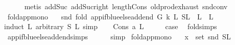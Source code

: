 \begin{isabellebody}
\ \ \ \ \isamarkupfalse%
\ {\isacharparenleft}{\kern0pt}metis\ add{\isacharunderscore}{\kern0pt}Suc\ add{\isacharunderscore}{\kern0pt}Suc{\isacharunderscore}{\kern0pt}right\ length{\isacharunderscore}{\kern0pt}Cons\ old{\isachardot}{\kern0pt}prod{\isachardot}{\kern0pt}exhaust\ snd{\isacharunderscore}{\kern0pt}conv{\isacharparenright}{\kern0pt}\ \isanewline
{}\isamarkupfalse%
%
\endisatagproof
{\isafoldproof}%
%
\isadelimproof
\isanewline
%
\endisadelimproof
\isanewline
{}\isamarkupfalse%
\ fold{\isacharunderscore}{\kern0pt}app{\isacharunderscore}{\kern0pt}mono{\isacharcolon}{\kern0pt}\isanewline
\ \ \ {\isachardoublequoteopen}snd\ {\isacharparenleft}{\kern0pt}fold\ {\isacharparenleft}{\kern0pt}app{\isacharunderscore}{\kern0pt}if{\isacharunderscore}{\kern0pt}blue{\isacharunderscore}{\kern0pt}else{\isacharunderscore}{\kern0pt}add{\isacharunderscore}{\kern0pt}end\ G\ k{\isacharparenright}{\kern0pt}\ L{}\ {\isacharparenleft}{\kern0pt}S{\isacharcomma}{\kern0pt}L{}{\isacharparenright}{\kern0pt}{\isacharparenright}{\kern0pt}\ {\isacharequal}{\kern0pt}\ L{}\ {\isacharat}{\kern0pt}\ L{}\ {\isachardoublequoteclose}\isanewline
%
\isadelimproof
%
\endisadelimproof
%
\isatagproof
{}\isamarkupfalse%
{\isacharparenleft}{\kern0pt}induct\ L{}\ arbitrary{\isacharcolon}{\kern0pt}\ S\ L{}{\isacharcomma}{\kern0pt}\ simp{\isacharparenright}{\kern0pt}\isanewline
\ \ \isamarkupfalse%
\ {\isacharparenleft}{\kern0pt}Cons\ a\ L{}{\isacharparenright}{\kern0pt}\isanewline
\ \ \isamarkupfalse%
\ \isamarkupfalse%
\ {\isacharquery}{\kern0pt}case\ \isamarkupfalse%
\ fold{\isacharunderscore}{\kern0pt}simps{\isacharparenleft}{\kern0pt}{}{\isacharparenright}{\kern0pt}\ \isamarkupfalse%
\ app{\isacharunderscore}{\kern0pt}if{\isacharunderscore}{\kern0pt}blue{\isacharunderscore}{\kern0pt}else{\isacharunderscore}{\kern0pt}add{\isacharunderscore}{\kern0pt}end{\isachardot}{\kern0pt}simps\isanewline
\ \ \ \ \isamarkupfalse%
\ simp\isanewline
{}\isamarkupfalse%
%
\endisatagproof
{\isafoldproof}%
%
\isadelimproof
\isanewline
%
\endisadelimproof
\isanewline
\isanewline
{}\isamarkupfalse%
\ fold{\isacharunderscore}{\kern0pt}app{\isacharunderscore}{\kern0pt}mono{}{\isacharcolon}{\kern0pt}\isanewline
\ \ \ {\isachardoublequoteopen}x\ {\isasymin}\ set\ {\isacharparenleft}{\kern0pt}snd\ {\isacharparenleft}{\kern0pt}S{\isacharcomma}{\kern0pt}L{}{\isacharparenright}{\kern0pt}{\isacharparenright}{\kern0pt}{\isachardoublequoteclose}\isanewline

\end{isabellebody}
